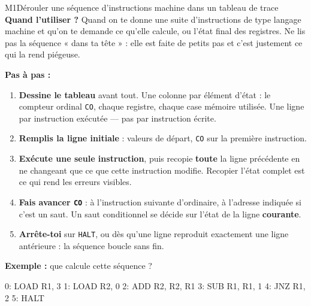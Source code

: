 \begin{fichemethode}{M1}{Dérouler une séquence d'instructions machine dans un tableau de trace}
\textbf{Quand l'utiliser ?} Quand on te donne une suite d'instructions de type langage
machine et qu'on te demande ce qu'elle calcule, ou l'état final des registres. Ne lis pas
la séquence « dans ta tête » : elle est faite de petits pas et c'est justement ce qui la
rend piégeuse.

\textbf{Pas à pas :}
\begin{enumerate}
  \item \textbf{Dessine le tableau} avant tout. Une colonne par élément d'état : le compteur
    ordinal \lstinline{CO}, chaque registre, chaque case mémoire utilisée. Une ligne par
    instruction exécutée — pas par instruction écrite.
  \item \textbf{Remplis la ligne initiale} : valeurs de départ, \lstinline{CO} sur la
    première instruction.
  \item \textbf{Exécute une seule instruction}, puis recopie \textbf{toute} la ligne
    précédente en ne changeant que ce que cette instruction modifie. Recopier l'état complet
    est ce qui rend les erreurs visibles.
  \item \textbf{Fais avancer \lstinline{CO}} : à l'instruction suivante d'ordinaire, à
    l'adresse indiquée si c'est un saut. Un saut conditionnel se décide sur l'état de la
    ligne \textbf{courante}.
  \item \textbf{Arrête-toi} sur \lstinline{HALT}, ou dès qu'une ligne reproduit exactement
    une ligne antérieure : la séquence boucle sans fin.
\end{enumerate}

\textbf{Exemple :} que calcule cette séquence ?

\begin{console}
0: LOAD  R1, 3
1: LOAD  R2, 0
2: ADD   R2, R2, R1
3: SUB   R1, R1, 1
4: JNZ   R1, 2
5: HALT
\end{console}


\end{fichemethode}
